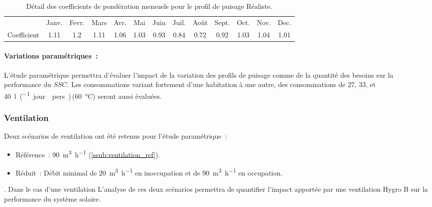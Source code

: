 \begin{table}
\centering
\begin{tabular}{l*{12}{c}}
    \toprule
                & Janv. & Fevr. & Mars & Avr. & Mai & Juin & Juil. & Août & Sept. & Oct. & Nov. & Dec. \\
    \cmidrule[\lightrulewidth](){2-13}
    Coefficient & \num{1.11}   & \num{1.2}   & \num{1.11}  & \num{1.06}  & \num{1.03}  & \num{0.93}   & \num{0.84}    & \num{0.72}   & \num{0.92}    & \num{1.03}  & \num{1.04}  & \num{1.01}  \\
    \bottomrule
\end{tabular}
\caption{Détail des coefficients de pondération mensuels pour le profil de
         puisage Réaliste.}
         \label{tab:coef_mois}
\end{table}

\paragraph{Variations paramétriques~:} %
\label{par:variations_parametriques}
L’étude paramétrique permettra d’évaluer l’impact de la variation des profils de puisage
comme de la quantité des besoins sur la performance du $SSC$. Les consommations variant
fortement d’une habitation à une autre, des consommations de 27, 33, et
\SI{40}{\litre\per(jour \period  pers)}\,(\SI{60}{\celsius}) seront aussi évaluées.


\subsubsection{Ventilation} %
\label{ssub:ventilation}
Deux scénarios de ventilation ont été retenus pour l’étude paramétrique~:
\begin{itemize}
    \item Référence~: \SI[per-mode=symbol]{90}{\meter\cubed\per\hour} (\ref{ssub:ventilation_ref}).
    \item Réduit~: Débit minimal de \SI[per-mode=symbol]{20}{\meter\cubed\per\hour} en inoccupation et de
          \SI[per-mode=symbol]{90}{\meter\cubed\per\hour} en occupation.
\end{itemize}.
Dans le cas d’une ventilation L’analyse de ces deux scénarios permettra de quantifier
l’impact apportée par une ventilation Hygro B sur la performance du système solaire.


